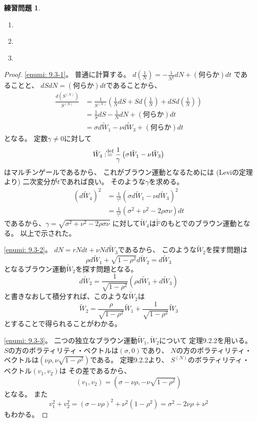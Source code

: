\documentclass[uplatex]{jsarticle}
\theoremstyle{definition}
\newtheorem{prob}[prob]{練習問題}
\def\P{\mathbb{P}}
\def\dfn{:\overset{\mbox{{\scriptsize def}}}{=}}
\begin{document}
\begin{prob}\label{prob: 9.3}
  \begin{enumerate}
    \item \label{enumi: 9.3-1}
    \item \label{enumi: 9.3-2}
    \item \label{enumi: 9.3-3}
  \end{enumerate}
\end{prob}

\begin{proof}
  \ref{enumi: 9.3-1}。
  普通に計算する。
  \(d\left( \frac{1}{N} \right) = -\frac{1}{N^2}dN + (\text{何らか})dt\)
  であることと、
  \(dSdN = (\text{何らか})dt\)であることから、
  \begin{align*}
    \frac{d\left(S^{(N)}\right)}{S^{(N)}}
    &= \frac{1}{S^{(N)}}\left( \frac{1}{N}dS
    + S d\left( \frac{1}{N} \right)
    + dS d\left( \frac{1}{N} \right)\right) \\
    &= \frac{1}{S}dS - \frac{1}{N}dN + (\text{何らか})dt \\
    &= \sigma d\tilde{W}_1 - \nu d\tilde{W}_3 + (\text{何らか})dt
  \end{align*}
  となる。
  定数\(\gamma \neq 0\)に対して
  \[
  \tilde{W}_4 \dfn
  \frac{1}{\gamma}\left( \sigma \tilde{W}_1 - \nu \tilde{W}_3 \right)
  \]
  はマルチンゲールであるから、
  これがブラウン運動となるためには (Leviの定理より)
  二次変分が\(t\)であれば良い。
  そのような\(\gamma\)を求める。
  \begin{align*}
    \left( d\tilde{W}_4 \right)^2
    &= \frac{1}{\gamma^2}\left( \sigma d\tilde{W}_1 - \nu d\tilde{W}_3 \right)^2 \\
    &= \frac{1}{\gamma^2}\left( \sigma^2 + \nu^2 - 2\rho\sigma\nu \right) dt
  \end{align*}
  であるから、\(\gamma = \sqrt{\sigma^2 + \nu^2 - 2\rho\sigma\nu}\)
  に対して\(\tilde{W}_4\)は\(\tilde{\P}\)のもとでのブラウン運動となる。
  以上で示された。

  \ref{enumi: 9.3-2}。
  \(dN = rNdt + \nu N d\tilde{W}_3\)であるから、
  このような\(\tilde{W}_2\)を探す問題は
  \[
  \rho d\tilde{W}_1 + \sqrt{1-\rho^2}d\tilde{W}_2 = d\tilde{W}_3
  \]
  となるブラウン運動\(\tilde{W}_2\)を探す問題となる。
  \[
  d\tilde{W}_2
  = \frac{1}{\sqrt{1-\rho^2}}
  \left( \rho d\tilde{W}_1 + d\tilde{W}_3 \right)
  \]
  と書きなおして積分すれば、このような\(\tilde{W}_2\)は
  \[
  \tilde{W}_2
  = \frac{\rho}{\sqrt{1-\rho^2}}\tilde{W}_1
  + \frac{1}{\sqrt{1-\rho^2}}\tilde{W}_3
  \]
  とすることで得られることがわかる。

  \ref{enumi: 9.3-3}。
  二つの独立なブラウン運動\(\tilde{W}_1,\tilde{W}_2\)について
  定理9.2.2を用いる。
  \(S\)の方のボラティリティ・ベクトルは\((\sigma,0)\)であり、
  \(N\)の方のボラティリティ・ベクトルは\((\nu\rho, \nu\sqrt{1-\rho^2})\)である。
  定理9.2.2より、
  \(S^{(N)}\)のボラティリティ・ベクトル\((v_1,v_2)\)は
  その差であるから、
  \[
  (v_1,v_2) = (\sigma-\nu\rho,-\nu\sqrt{1-\rho^2})
  \]
  となる。
  また
  \[
  v_1^2+v_2^2
  = (\sigma-\nu\rho)^2 + \nu^2(1-\rho^2)
  = \sigma^2 - 2\nu\rho + \nu^2
  \]
  もわかる。
\end{proof}
\end{document}
